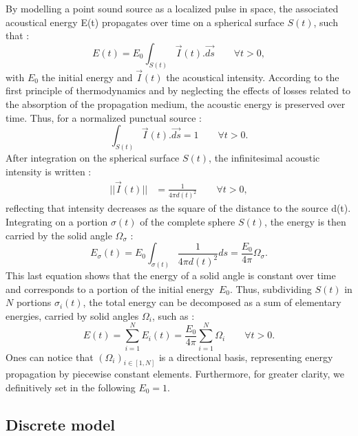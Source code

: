 \documentclass[AMA,STIX1COL]{WileyNJD-v2}
\begin{document}
By modelling a point sound source as a localized pulse in space, the associated acoustical energy E(t) propagates \cite{jouhaneau} over time on a spherical surface $S(t)$, such that :
%
\begin{equation} 
E(t) = E_0 \int_{S(t)} \overrightarrow{I}(t).\overrightarrow{ds} \qquad \forall t > 0,
\end{equation}
%
with $E_0$ the initial energy and $\overrightarrow{I}(t)$ the acoustical intensity. According to the first principle of thermodynamics and by neglecting the effects of losses related to the absorption of the propagation medium, the acoustic energy is preserved over time. Thus, for a normalized punctual source :
%
\begin{equation} 
\int_{S(t)} \overrightarrow{I}(t).\overrightarrow{ds} = 1 \qquad \forall t > 0.
\label{eq_2}
\end{equation}
%
After integration on the spherical surface $S(t)$, the infinitesimal acoustic intensity is written :
\begin{align} 
|| \overrightarrow{I}(t) || &= \frac{1}{4\pi d(t)^2} \qquad \forall t > 0,
\end{align}
%
reflecting that intensity decreases as the square of the distance to the source d(t). Integrating on a portion $\sigma(t)$ of the complete sphere $S(t)$, the energy is then carried by the solid angle $\Omega_{\sigma}$ :
%
\begin{equation}
E_{\sigma}(t) = E_0 \int_{\sigma(t)}  \frac{1}{4\pi  d(t)^2} ds = \frac{E_0}{4\pi}  \Omega_{\sigma}.
\label{eq_4}
\end{equation}
%
This last equation shows that the energy of a solid angle is constant over time and corresponds to a portion of the initial energy~$E_0$. Thus, subdividing $S(t)$ in $N$ portions $\sigma_i(t)$, the total energy can be decomposed as a sum of elementary energies, carried by solid angles $\Omega_i$, such as : 
%
\begin{equation}
E(t) = \sum_{i=1}^N E_i(t) = \frac{E_0}{4\pi}  \sum_{i=1}^N \Omega_i  \qquad \forall t > 0.
\label{eq_5}
\end{equation}
Ones can notice that $(\Omega_i)_{i\in[1,N] }$ is a directional basis, representing energy propagation by piecewise constant elements. Furthermore, for greater clarity, we definitively set in the following $E_0 = 1$.

\subsection{Discrete model}
\end{document}

